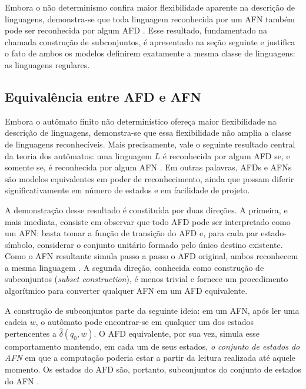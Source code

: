 \documentclass[
    12pt
    ,oneside
    ,a4paper
    ,chapter=TITLE
    ,section=TITLE
    ,sumario=abnt-6027-2012]{abntex2}
\begin{document}
Embora o não determinismo confira maior flexibilidade aparente na descrição de linguagens,
demonstra-se que toda linguagem reconhecida por um AFN também pode ser reconhecida por algum
AFD \cite{hopcroft2006,sipser2012}. Esse resultado, fundamentado na chamada construção
de subconjuntos, é apresentado na seção seguinte e justifica o fato de ambos os modelos
definirem exatamente a mesma classe de linguagens: as linguagens regulares.

\subsection{Equivalência entre AFD e AFN}
\label{sec:equivalencia}
Embora o autômato finito não determinístico ofereça maior flexibilidade na descrição de
linguagens, demonstra-se que essa flexibilidade não amplia a classe de linguagens reconhecíveis.
Mais precisamente, vale o seguinte resultado central da teoria dos autômatos: uma linguagem $L$
é reconhecida por algum AFD se, e somente se, é reconhecida por algum AFN
\cite{hopcroft2006,sipser2012}. Em outras palavras, AFDs e AFNs são modelos
equivalentes em poder de reconhecimento, ainda que possam diferir significativamente em
número de estados e em facilidade de projeto.

A demonstração desse resultado é constituída por duas direções. A primeira, e mais imediata,
consiste em observar que todo AFD pode ser interpretado como um AFN: basta tomar a função de
transição do AFD e, para cada par estado-símbolo, considerar o conjunto unitário formado pelo
único destino existente. Como o AFN resultante simula passo a passo o AFD original, ambos
reconhecem a mesma linguagem \cite{hopcroft2006}. A segunda direção, conhecida como
construção de subconjuntos (\textit{subset construction}), é menos trivial e fornece um
procedimento algorítmico para converter qualquer AFN em um AFD equivalente.

A construção de subconjuntos parte da seguinte ideia: em um AFN, após ler uma cadeia $w$, o
autômato pode encontrar-se em qualquer um dos estados pertencentes a $\hat{\delta}(q_0, w)$. O
AFD equivalente, por sua vez, simula esse comportamento mantendo, em cada um de seus estados,
\textit{o conjunto de estados do AFN} em que a computação poderia estar a partir da leitura
realizada até aquele momento. Os estados do AFD são, portanto, subconjuntos do conjunto de
estados do AFN \cite{hopcroft2006}.
\end{document}
